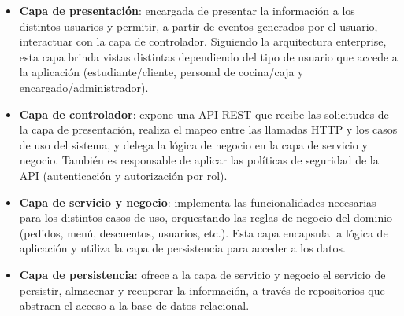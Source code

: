 \begin{itemize}
  \item \textbf{Capa de presentación}: encargada de presentar la información a los distintos usuarios y permitir, a partir de eventos generados por el usuario, interactuar con la capa de controlador. Siguiendo la arquitectura enterprise, esta capa brinda vistas distintas dependiendo del tipo de usuario que accede a la aplicación (estudiante/cliente, personal de cocina/caja y encargado/administrador).

  \item \textbf{Capa de controlador}: expone una API REST que recibe las solicitudes de la capa de presentación, realiza el mapeo entre las llamadas HTTP y los casos de uso del sistema, y delega la lógica de negocio en la capa de servicio y negocio. También es responsable de aplicar las políticas de seguridad de la API (autenticación y autorización por rol).

  \item \textbf{Capa de servicio y negocio}: implementa las funcionalidades necesarias para los distintos casos de uso, orquestando las reglas de negocio del dominio (pedidos, menú, descuentos, usuarios, etc.). Esta capa encapsula la lógica de aplicación y utiliza la capa de persistencia para acceder a los datos.

  \item \textbf{Capa de persistencia}: ofrece a la capa de servicio y negocio el servicio de persistir, almacenar y recuperar la información, a través de repositorios que abstraen el acceso a la base de datos relacional.
\end{itemize}

\newpage
